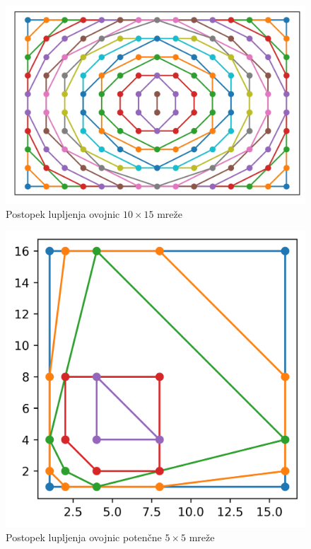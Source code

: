 \documentclass[a4paper]{article}
\begin{document}
\begin{figure}[!h]
	\centering
	\caption{Postopek lupljenja ovojnic $10 \times 15$ mreže}
	\label{fig:10x15}
	\vspace{2mm}
	\includegraphics[scale=0.5]{10x15_enakomerna.jpg}
\end{figure}

\begin{figure}[!h]
	\centering
	\caption{Postopek lupljenja ovojnic potenčne $5 \times 5$ mreže}
	\label{fig:5x5}
	\vspace{2mm}
	\includegraphics[scale=0.5]{5x5_potencna.png}
\end{figure}
\end{document}
